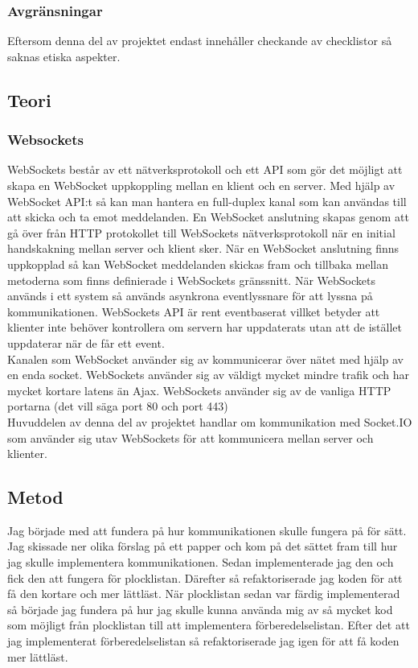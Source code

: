 \subsubsection{Avgränsningar}
Eftersom denna del av projektet endast innehåller checkande av checklistor så saknas etiska aspekter.

\pagebreak
\subsection{Teori}
\subsubsection{Websockets}
WebSockets består av ett nätverksprotokoll och ett API som gör det möjligt att skapa en WebSocket uppkoppling mellan en klient och en server. Med hjälp av WebSocket API:t så kan man hantera en full-duplex kanal som kan användas till att skicka och ta emot meddelanden. En WebSocket anslutning skapas genom att gå över från HTTP protokollet till WebSockets nätverksprotokoll när en initial handskakning mellan server och klient sker. När en WebSocket anslutning finns uppkopplad så kan WebSocket meddelanden skickas fram och tillbaka mellan metoderna som finns definierade i WebSockets gränssnitt. När WebSockets används i ett system så används asynkrona eventlyssnare för att lyssna på kommunikationen. WebSockets API är rent eventbaserat villket betyder att klienter inte behöver kontrollera om servern har uppdaterats utan att de istället uppdaterar när de får ett event. \cite{websocketbook} \\

Kanalen som WebSocket använder sig av kommunicerar över nätet med hjälp av en enda socket. WebSockets använder sig av väldigt mycket mindre trafik och har mycket kortare latens än Ajax. WebSockets använder sig av de vanliga HTTP portarna (det vill säga port 80 och port 443) \cite{websocketreport} \\

Huvuddelen av denna del av projektet handlar om kommunikation med Socket.IO som använder sig utav WebSockets för att kommunicera mellan server och klienter.

\pagebreak
 
\subsection{Metod}
Jag började med att fundera på hur kommunikationen skulle fungera på för sätt. Jag skissade ner olika förslag på ett papper och kom på det sättet fram till hur jag skulle implementera kommunikationen. Sedan implementerade jag den och fick den att fungera för plocklistan. Därefter så refaktoriserade jag koden för att få den kortare och mer lättläst. När plocklistan sedan var färdig implementerad så började jag fundera på hur jag skulle kunna använda mig av så mycket kod som möjligt från plocklistan till att implementera förberedelselistan. Efter det att jag implementerat förberedelselistan så refaktoriserade jag igen för att få koden mer lättläst.


